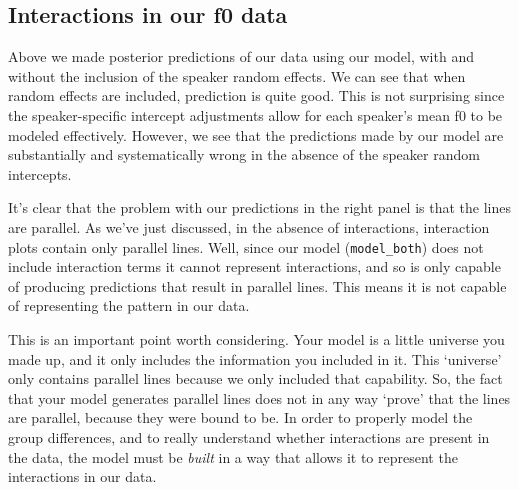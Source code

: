 \documentclass[
]{book}
\begin{document}
\hypertarget{interactions-in-our-f0-data}{%
\subsection{Interactions in our f0 data}\label{interactions-in-our-f0-data}}

Above we made posterior predictions of our data using our model, with and without the inclusion of the speaker random effects. We can see that when random effects are included, prediction is quite good. This is not surprising since the speaker-specific intercept adjustments allow for each speaker's mean f0 to be modeled effectively. However, we see that the predictions made by our model are substantially and systematically wrong in the absence of the speaker random intercepts.

It's clear that the problem with our predictions in the right panel is that the lines are parallel. As we've just discussed, in the absence of interactions, interaction plots contain only parallel lines. Well, since our model (\texttt{model\_both}) does not include interaction terms it cannot represent interactions, and so is only capable of producing predictions that result in parallel lines. This means it is not capable of representing the pattern in our data.

This is an important point worth considering. Your model is a little universe you made up, and it only includes the information you included in it. This `universe' only contains parallel lines because we only included that capability. So, the fact that your model generates parallel lines does not in any way `prove' that the lines are parallel, because they were bound to be. In order to properly model the group differences, and to really understand whether interactions are present in the data, the model must be \emph{built} in a way that allows it to represent the interactions in our data.
\end{document}
